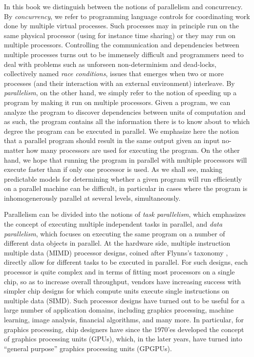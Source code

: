 \documentclass[11pt]{book}
\begin{document}
In this book we distinguish between the notions of parallelism and
concurrency. By \emph{concurrency}, we refer to programming language
controls for coordinating work done by multiple virtual
processes. Such processes may in principle run on the same physical
processor (using for instance time sharing) or they may run on
multiple processors. Controlling the communication and dependencies
between multiple processes turns out to be immensely difficult and
programmers need to deal with problems such as unforseen
non-determinism and dead-locks, collectively named \emph{race
  conditions}, issues that emerges when two or more processes (and
their interaction with an external environment) interleave. By
\emph{parallelism}, on the other hand, we simply refer to the notion
of speeding up a program by making it run on multiple
processors. Given a program, we can analyze the program to discover
dependencies between units of computation and as such, the program
contains all the information there is to know about to which degree
the program can be executed in parallel. We emphasize here the notion
that a parallel program should result in the same output given an
input no-matter how many processors are used for executing the
program. On the other hand, we hope that running the program in
parallel with multiple processors will execute faster than if only one
processor is used. As we shall see, making predictable models for
determining whether a given program will run efficiently on a parallel
machine can be difficult, in particular in cases where the program is
inhomogenerously parallel at several levels, simultaneously.

Parallelism can be divided into the notions of \emph{task
  parallelism}, which emphasizes the concept of executing multiple
independent tasks in parallel, and \emph{data parallelism}, which
focuses on executing the same program on a number of different data
objects in parallel. At the hardware side, multiple instruction
multiple data (MIMD) processor designs, coined after Flynns's taxonomy
\cite{Flynn1972}, directly allow for different tasks to be executed in
parallel. For such designs, each processor is quite complex and in
terms of fitting most processors on a single chip, so as to increase
overall throughput, vendors have increasing success with simpler chip
designs for which compute units execute single instructions on
multiple data (SIMD). Such processor designs have turned out to be
useful for a large number of application domains, including graphics
processing, machine learning, image analysis, financial algorithms,
and many more. In particular, for graphics processing, chip designers
have since the 1970'es developed the concept of graphics processing
units (GPUs), which, in the later years, have turned into ``general
purpose'' graphics processing units (GPGPUs).
\end{document}
